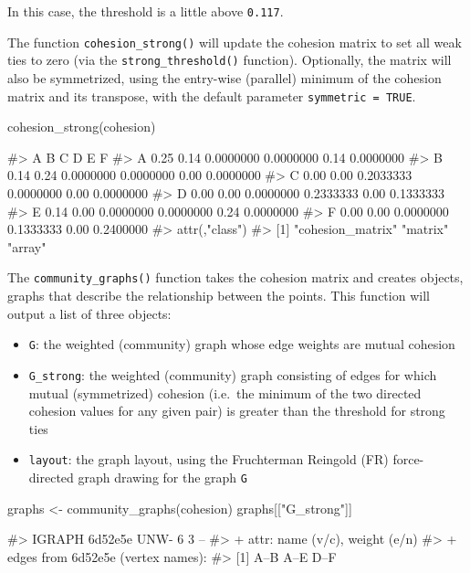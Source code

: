 In this case, the threshold is a little above \texttt{0.117}.

The function \texttt{cohesion\_strong()} will update the cohesion matrix
to set all weak ties to zero (via the \texttt{strong\_threshold()}
function). Optionally, the matrix will also be symmetrized, using the
entry-wise (parallel) minimum of the cohesion matrix and its transpose,
with the default parameter \texttt{symmetric\ =\ TRUE}.

\begin{Schunk}
\begin{Sinput}
cohesion_strong(cohesion)
\end{Sinput}
\begin{Soutput}
#>      A    B         C         D    E         F
#> A 0.25 0.14 0.0000000 0.0000000 0.14 0.0000000
#> B 0.14 0.24 0.0000000 0.0000000 0.00 0.0000000
#> C 0.00 0.00 0.2033333 0.0000000 0.00 0.0000000
#> D 0.00 0.00 0.0000000 0.2333333 0.00 0.1333333
#> E 0.14 0.00 0.0000000 0.0000000 0.24 0.0000000
#> F 0.00 0.00 0.0000000 0.1333333 0.00 0.2400000
#> attr(,"class")
#> [1] "cohesion_matrix" "matrix"          "array"
\end{Soutput}
\end{Schunk}

The \texttt{community\_graphs()} function takes the cohesion matrix and
creates  objects, graphs that describe the relationship
between the points. This function will output a list of three objects:

\begin{itemize}
\tightlist
\item
  \texttt{G}: the weighted (community) graph whose edge weights are
  mutual cohesion
\item
  \texttt{G\_strong}: the weighted (community) graph consisting of edges
  for which mutual (symmetrized) cohesion (i.e.~the minimum of the two
  directed cohesion values for any given pair) is greater than the
  threshold for strong ties
\item
  \texttt{layout}: the graph layout, using the Fruchterman Reingold (FR)
  force-directed graph drawing for the graph \texttt{G}
\end{itemize}

\begin{Schunk}
\begin{Sinput}
graphs <- community_graphs(cohesion)
graphs[["G_strong"]]
\end{Sinput}
\begin{Soutput}
#> IGRAPH 6d52e5e UNW- 6 3 -- 
#> + attr: name (v/c), weight (e/n)
#> + edges from 6d52e5e (vertex names):
#> [1] A--B A--E D--F
\end{Soutput}
\end{Schunk}

